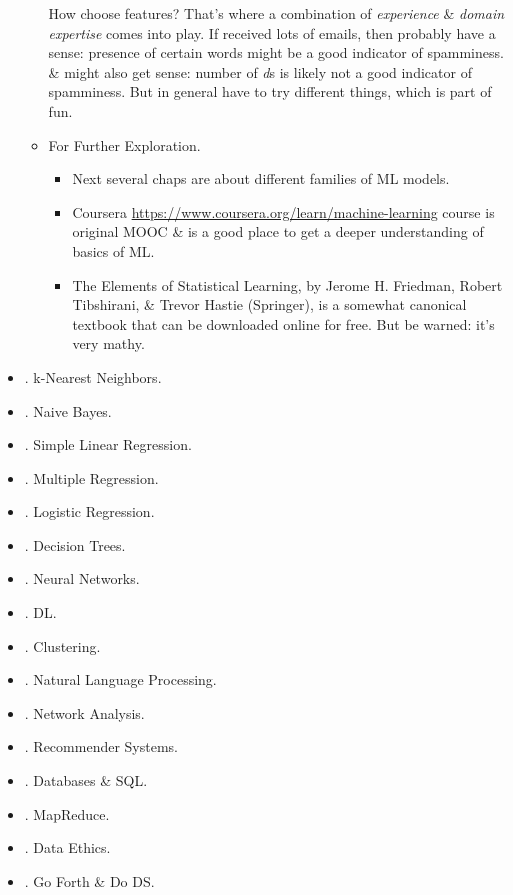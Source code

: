 \documentclass{article}
\begin{document}
\begin{itemize}
\begin{itemize}
		How choose features? That's where a combination of {\it experience} \& {\it domain expertise} comes into play. If received lots of emails, then probably have a sense: presence of certain words might be a good indicator of spamminess. \& might also get sense: number of {\it d}s is likely not a good indicator of spamminess. But in general have to try different things, which is part of fun.
		\item {\sf For Further Exploration.}
		\begin{itemize}
			\item Next several chaps are about different families of ML models.
			\item Coursera \url{https://www.coursera.org/learn/machine-learning} course is original MOOC \& is a good place to get a deeper understanding of basics of ML.
			\item The Elements of Statistical Learning, by Jerome H. Friedman, Robert Tibshirani, \& Trevor Hastie (Springer), is a somewhat canonical textbook that can be downloaded online for free. But be warned: it's very mathy.
		\end{itemize}
	\end{itemize}
	\item {. k-Nearest Neighbors.}
	\item {. Naive Bayes.}
	\item {. Simple Linear Regression.}
	\item {. Multiple Regression.}
	\item {. Logistic Regression.}
	\item {. Decision Trees.}
	\item {. Neural Networks.}
	\item {. DL.}
	\item {. Clustering.}
	\item {. Natural Language Processing.}
	\item {. Network Analysis.}
	\item {. Recommender Systems.}
	\item {. Databases \& SQL.}
	\item {. MapReduce.}
	\item {. Data Ethics.}
	\item {. Go Forth \& Do DS.}
\end{itemize}

\end{document}
